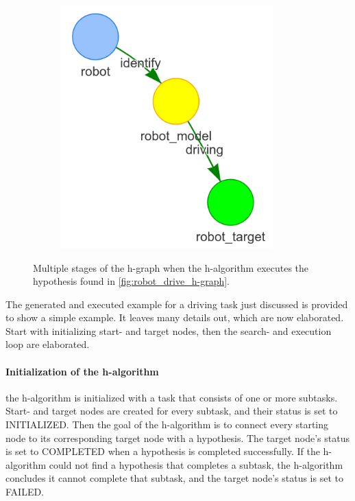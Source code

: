 \begin{figure}[h]
\begin{subfigure}{.3\textwidth}
    \end{subfigure}
    \begin{subfigure}{.3\textwidth}
    \centering
    \includegraphics[width=0.9\textwidth]{figures/proposed_method/connecting_nodes/robot_to_target/execute_robot_to_target_3}
    \end{subfigure}
    \caption{Multiple stages of the \ac{h-graph} when the \ac{h-algorithm} executes the hypothesis found in \cref{fig:robot_drive_h-graph}.}
    \label{fig:execute_robot_to_target}
\end{figure}

The generated and executed example for a driving task just discussed is provided to show a simple example. It leaves many details out, which are now elaborated. Start with initializing start- and target nodes, then the search- and execution loop are elaborated.\bs

\paragraph{Initialization of the \ac{h-algorithm}}
the \ac{h-algorithm} is initialized with a task that consists of one or more subtasks. Start- and target nodes are created for every subtask, and their status is set to INITIALIZED. Then the goal of the \ac{h-algorithm} is to connect every starting node to its corresponding target node with a hypothesis. The target node's status is set to COMPLETED when a hypothesis is completed successfully. If the \ac{h-algorithm} could not find a hypothesis that completes a subtask, the \ac{h-algorithm} concludes it cannot complete that subtask, and the target node's status is set to FAILED.\bs

